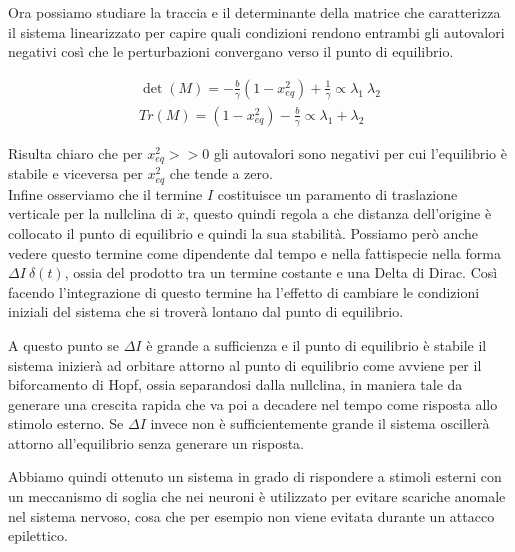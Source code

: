 Ora possiamo studiare la traccia e il determinante della matrice che caratterizza il sistema linearizzato per capire quali condizioni rendono entrambi gli autovalori negativi così che le perturbazioni convergano verso il punto di equilibrio.

\begin{align}
\det(M)= -\frac{b}{\gamma}(1-x^2_{eq})+\frac{1}{\gamma}\propto\lambda_1\ \lambda_2\\
Tr (M)=(1-x^2_{eq})-\frac{b}{\gamma}\propto\lambda_1+\lambda_2
\end{align}

Risulta chiaro che per $x_{eq}^2>>0$ gli autovalori sono negativi per cui l'equilibrio è stabile e viceversa per $x_{eq}^2$ che tende a zero.\\

Infine osserviamo che il termine $I$ costituisce un paramento di traslazione verticale per la nullclina di $\dot{x}$, questo quindi regola a che distanza dell'origine è collocato il punto di equilibrio e quindi la sua stabilità. Possiamo però anche vedere questo termine come dipendente dal tempo e nella fattispecie nella forma $\Delta I\ \delta(t)$, ossia del prodotto tra un termine costante e una Delta di Dirac. Così facendo l'integrazione di questo termine ha l'effetto di cambiare le condizioni iniziali del sistema che si troverà lontano dal punto di equilibrio.

A questo punto se $\Delta I$ è grande a sufficienza e il punto di equilibrio è stabile  il sistema inizierà ad orbitare attorno al punto di equilibrio come avviene per il biforcamento di Hopf, ossia separandosi dalla nullclina, in maniera tale da generare una crescita rapida che va poi a decadere nel tempo come risposta allo stimolo esterno. Se $\Delta I$ invece non è sufficientemente grande il sistema oscillerà attorno all'equilibrio senza generare un risposta.
\begin{center}
\end{center}

Abbiamo quindi ottenuto un sistema in grado di rispondere a stimoli esterni con un meccanismo di soglia che nei neuroni è utilizzato per evitare scariche anomale nel sistema nervoso, cosa che per esempio non viene evitata durante un attacco epilettico.

